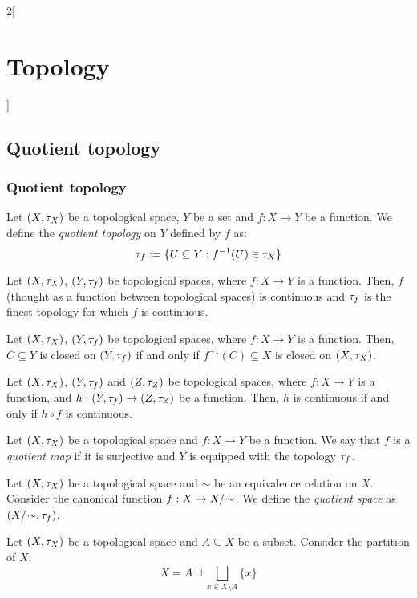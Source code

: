 \documentclass[../../../main.tex]{subfiles}
\begin{document}
\begin{multicols}{2}[\section{Topology}]
    \subsection{Quotient topology}
    \subsubsection{Quotient topology}
    \begin{definition}
        Let $(X,\tau_X)$ be a topological space, $Y$ be a set and $f:X\rightarrow Y$ be a function. We define the \emph{quotient topology} on $Y$ defined by $f$ as: $$\tau_f:=\{U\subseteq Y:f^{-1}(U)\in\tau_X\}$$
    \end{definition}
    \begin{prop}
        Let $(X,\tau_X)$, $(Y,\tau_f)$ be topological spaces, where $f:X\rightarrow Y$ is a function. Then, $f$ (thought as a function between topological spaces) is continuous and $\tau_f$ is the finest topology for which $f$ is continuous.
    \end{prop}
    \begin{prop}
        Let $(X,\tau_X)$, $(Y,\tau_f)$ be topological spaces, where $f:X\rightarrow Y$ is a function. Then, $C\subseteq Y$ is closed on $(Y,\tau_f)$ if and only if $f^{-1}(C)\subseteq X$ is closed on $(X,\tau_X)$.
    \end{prop}
    \begin{prop}
        Let $(X,\tau_X)$, $(Y,\tau_f)$ and $(Z,\tau_Z)$ be topological spaces, where $f:X\rightarrow Y$ is a function, and $h:(Y,\tau_f)\rightarrow(Z,\tau_Z)$ be a function. Then, $h$ is continuous if and only if $h\circ f$ is continuous.
    \end{prop}
    \begin{definition}
        Let $(X,\tau_X)$ be a topological space and $f:X\rightarrow Y$ be a function. We say that $f$ is a \emph{quotient map} if it is surjective and $Y$ is equipped with the topology $\tau_f$.
    \end{definition}
    \begin{definition}
        Let $(X,\tau_X)$ be a topological space and $\sim$ be an equivalence relation on $X$. Consider the canonical function $f:X\rightarrow\quot{X}{\!\sim}$. We define the \emph{quotient space} as $(\quot{X}{\!\sim},\topo_f)$.
    \end{definition}
    \begin{definition}
        Let $(X,\tau_X)$ be a topological space and $A\subseteq X$ be a subset. Consider the partition of $X$: $$X=A\sqcup\bigsqcup_{x\in X\setminus A}\{x\}$$

\end{definition}
\end{multicols}
\end{document}
